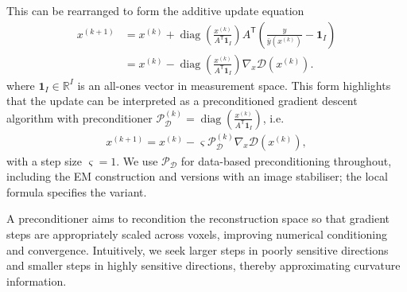 This can be rearranged to form the additive update equation
\begin{align}
    x^{(k+1)}
    & = x^{(k)} +
    \operatorname{diag}\!\left(\frac{x^{(k)}}{A^{\mathsf T}\mathbf{1}_I}\right)
        A^{\mathsf T}\!\left(\frac{y}{\bar{y}\!\left(x^{(k)}\right)} -\mathbf{1}_I \right) \nonumber \\
     & = x^{(k)} -
    \operatorname{diag}\!\left(\frac{x^{(k)}}{A^{\mathsf T}\mathbf{1}_I}\right)
        \nabla_x \mathcal{D}(x^{(k)}).
\end{align}
where $\mathbf{1}_I\in\mathbb{R}^{I}$ is an all-ones vector in measurement space. This form highlights that the  update can be interpreted as a preconditioned gradient descent algorithm with preconditioner $\mathcal{P}_{\mathcal D}^{(k)}=\operatorname{diag}\!\left(\frac{x^{(k)}}{A^{\mathsf T}\mathbf{1}_I}\right)$, i.e.
\begin{align}
    x^{(k+1)} = x^{(k)} - \varsigma \mathcal{P}_{\mathcal D}^{(k)} \nabla_x \mathcal{D}(x^{(k)}),
\end{align}
with a step size $\varsigma=1$. We use $\mathcal P_{\mathcal D}$ for data-based preconditioning throughout, including the EM construction and versions with an image stabiliser; the local formula specifies the variant.

A preconditioner aims to recondition the reconstruction space so that gradient steps are appropriately scaled across voxels, improving numerical conditioning and convergence. Intuitively, we seek larger steps in poorly sensitive directions and smaller steps in highly sensitive directions, thereby approximating curvature information.

